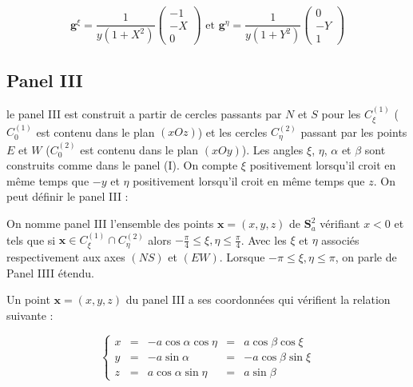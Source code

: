\begin{equation}
\mathbf{g}^{\xi} = \dfrac{1}{y(1+X^2)}\begin{pmatrix}
-1 \\ -X \\ 0
\end{pmatrix} \text{ et } \mathbf{g}^{\eta} = \dfrac{1}{y(1+Y^2)}\begin{pmatrix}
0 \\ -Y \\ 1
\end{pmatrix}
\label{eq: base duale II}
\end{equation}














\subsection{Panel III}

le panel III est construit a partir de cercles passants par $N$ et $S$ pour les $C_{\xi}^{(1)}$ ($C_{0}^{(1)}$ est contenu dans le plan $(xOz)$) et les cercles $C_{\eta}^{(2)}$ passant par les points $E$ et $W$ ($C_{0}^{(2)}$ est contenu dans le plan $(xOy)$). Les angles $\xi$, $\eta$, $\alpha$ et $\beta$ sont construits comme dans le panel (I). On compte $\xi$ positivement lorsqu'il croit en même temps que $-y$ et $\eta$ positivement lorsqu'il croit en même temps que $z$.
On peut définir le panel III :

\begin{definition}
On nomme panel III l'ensemble des points $\mathbf{x}=(x,y,z)$ de $\mathbf{S}_a^2$ vérifiant $x<0$ et tels que si $\mathbf{x} \in C_{\xi}^{(1)} \cap C_{\eta}^{(2)}$ alors $-\frac{\pi}{4}\leq \xi,\eta \leq \frac{\pi}{4}$. Avec les $\xi$ et $\eta$ associés respectivement aux axes $(NS)$ et $(EW)$. Lorsque $-\pi \leq \xi,\eta \leq \pi$, on parle de Panel IIII étendu.
\end{definition}

Un point $\mathbf{x}=(x,y,z)$ du panel III a ses coordonnées qui vérifient la relation suivante :

\begin{equation}
\left\lbrace
\begin{array}{rcccc}
x & = & - a \cos \alpha \cos \eta & = & a \cos \beta \cos \xi \\
y & = & - a \sin \alpha & = & - a \cos \beta \sin \xi \\
z & = & a \cos \alpha \sin \eta & = & a \sin \beta
\end{array}
\right.
\end{equation}


